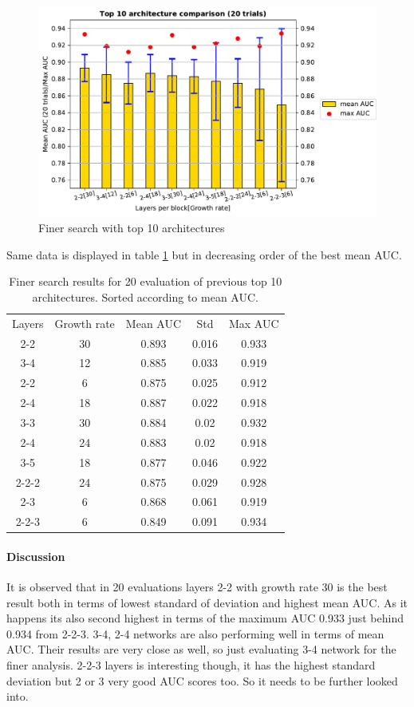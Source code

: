 \begin{figure}[ht]
\centering
\includegraphics[width=13cm,height=7cm]{images/densenet/siamese/densenet_siamese_finer_search}
\caption{Finer search with top 10 architectures}
\label{fig:arch_vs_auc_finer}
\end{figure}

Same data is displayed in table \ref{table:arch_vs_auc_finer_table} but in decreasing order of the best mean AUC.

\begin{table}[ht]
\centering
\caption[Finer search with 10 architectures]{Finer search results for 20 evaluation of previous top 10 architectures. Sorted according to mean AUC.}
 \begin{tabular}{|c c c c c|} 
 \hline\hline
 \rowcolor{lightgrey}
 Layers & Growth rate & Mean AUC & Std & Max AUC\\
 2-2 & 30 & 0.893 & 0.016 & 0.933\\
 3-4 & 12 & 0.885 & 0.033 & 0.919\\
 2-2 & 6 & 0.875 & 0.025 & 0.912\\
 2-4 & 18 & 0.887 & 0.022 & 0.918\\
 3-3 & 30 & 0.884 & 0.02 & 0.932\\
 2-4 & 24 & 0.883 & 0.02 & 0.918\\
 3-5 & 18 & 0.877 & 0.046 & 0.922\\
 2-2-2 & 24 & 0.875 & 0.029 & 0.928\\
 2-3 & 6 & 0.868 & 0.061 & 0.919\\
 2-2-3 & 6 & 0.849 & 0.091 & 0.934\\
 \hline \hline
\end{tabular}
\label{table:arch_vs_auc_finer_table}
\end{table}

\newpage
\paragraph{Discussion\\}
It is observed that in 20 evaluations layers 2-2 with growth rate 30 is the best result both in terms of lowest standard of deviation and highest mean AUC. As it happens its also second highest in terms of the 
 maximum AUC 0.933 just behind 0.934 from 2-2-3.
3-4, 2-4 networks are also performing well in terms of mean AUC. Their results are very close as well, so just evaluating 3-4 network for the finer analysis.
2-2-3 layers is interesting though, it has the highest standard deviation but 2 or 3 very good AUC scores too. So it needs to be further looked into.


